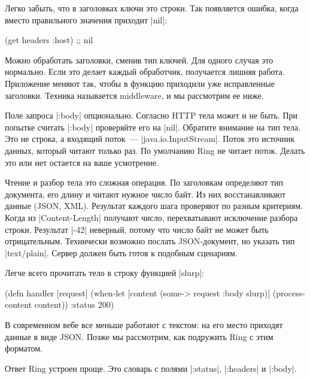 Легко забыть, что в заголовках ключи это строки. Так появляется ошибка, когда
вместо правильного значения приходит \spverb|nil|:

\begin{english}
  \begin{clojure}
(get headers :host) ;; nil
  \end{clojure}
\end{english}

Можно обработать заголовки, сменив тип ключей. Для одного случая это
нормально. Если это делает каждый обработчик, получается лишняя
работа. Приложение меняют так, чтобы в функцию приходили уже исправленные
заголовки. Техника называется middleware, и мы рассмотрим ее ниже.

Поле запроса \spverb|:body| опционально. Согласно HTTP тела может и не быть. При
попытке считать \spverb|:body| проверяйте его на \spverb|nil|. Обратите внимание
на тип тела. Это не строка, а входящий поток~---
\spverb|java.io.InputStream|. Поток это источник данных, который читают только
раз. По умолчанию Ring не читает поток. Делать это или нет остается на
ваше усмотрение.

Чтение и разбор тела это сложная операция. По заголовкам определяют тип
документа, его длину и читают нужное число байт. Из них восстанавливают данные
(JSON, XML). Результат каждого шага проверяют по разным критериям. Когда из
\spverb|Content-Length| получают число, перехватывают исключение разбора
строки. Результат \spverb|-42| неверный, потому что число байт не может быть
отрицательным. Технически возможно послать JSON-документ, но указать тип
\spverb|text/plain|. Сервер должен быть готов к подобным сценариям.

Легче всего прочитать тело в строку функцией \spverb|slurp|:

\begin{english}
  \begin{clojure}
(defn handler [request]
  (when-let [content (some-> request :body slurp)]
    (process-content content))
  {:status 200})
  \end{clojure}
\end{english}

В современном вебе все меньше работают с текстом: на его место приходят данные в
виде JSON. Позже мы рассмотрим, как подружить Ring с этим форматом.

Ответ Ring устроен проще. Это словарь с полями \spverb|:status|,
\spverb|:headers| и \spverb|:body|.

